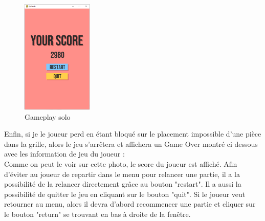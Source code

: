 \documentclass[a4paper]{report}
\begin{document}
\begin{figure}
    \centering
    \includegraphics[width=0.3\textwidth, trim=0pt 0pt 0pt 50pt]{images/4-end.png}
    \caption{Gameplay solo}
    \vspace{-20pt}
\end{figure}

Enfin, si je le joueur perd en étant bloqué sur le placement impossible d'une pièce dans la grille, alors le jeu s'arrêtera et affichera un Game Over montré ci dessous avec les information de jeu du joueur : \\

Comme on peut le voir sur cette photo, le score du joueur est affiché. Afin d'éviter au joueur de repartir dans le menu pour relancer une partie, il a la possibilité de la relancer directement grâce au bouton "restart". Il a aussi la possibilité de quitter le jeu en cliquant sur le bouton "quit". Si le joueur veut retourner au menu, alors il devra d'abord recommencer une partie et cliquer sur le bouton "return" se trouvant en bas à droite de la fenêtre. 

\pagebreak
\end{document}
